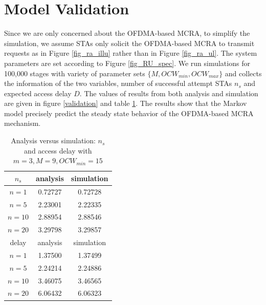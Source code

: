 \documentclass[journal]{IEEEtran}
\begin{document}
\section{Model Validation} 		\label{sec_model_val}
Since we are only concerned about the OFDMA-based MCRA, to simplify the simulation, we assume STAs only solicit the OFDMA-based MCRA to transmit requests as in Figure \ref{fig_ra_illu} rather than in Figure \ref{fig_ra_ul}. 
The system parameters are set according to Figure \ref{fig_RU_spec}.
We run simulations for 100,000 stages with variety of parameter sets $\lbrace M, OCW_{min}, OCW_{max}\rbrace$ and collects the information of the two variables, number of successful attempt STAs $n_s$ and expected access delay $D$. 
The values of results from both analysis and simulation are given in figure \ref{validation} and table \ref{table_val}. 
The results show that the Markov model precisely predict the steady state behavior of the OFDMA-based MCRA mechanism.
\begin{table}[!h]
\caption{Analysis versus simulation: $n_s$ and access delay with $m=3,M=9,OCW_{min} = 15$}
\label{table_val}
\begin{center}
\begin{tabular}{c|c|c}
\hline
$n_s$ 	& analysis 	& simulation \\
\hline
$n=1$ 	& 0.72727  	& 0.72728 \\
$n=5$ 	& 2.23001	& 2.22335 \\
$n=10$	& 2.88954	& 2.88546 \\
$n=20$	& 3.29798	& 3.29857 \\
\hline
delay	& analysis	& simulation \\
\hline
$n=1$ 	& 1.37500  	& 1.37499 \\
$n=5$ 	& 2.24214	& 2.24886 \\
$n=10$	& 3.46075	& 3.46565 \\
$n=20$	& 6.06432	& 6.06323 \\
\hline
\end{tabular}
\end{center}
\end{table}
\end{document}
